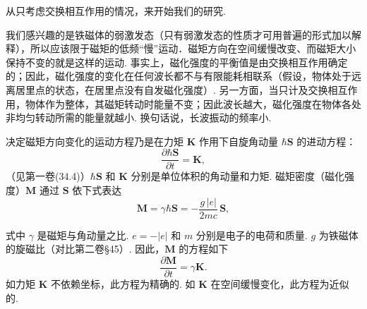 从只考虑交换相互作用的情况，来开始我们的研究.

我们感兴趣的是铁磁体的弱激发态（只有弱激发态的性质才可用普遍的形式加以解释），所以应该限于磁矩的低频“慢”运动．磁矩方向在空间缓慢改变、而磁矩大小保持不变的就是这样的运动. 事实上，磁化强度的平衡值是由交换相互作用确定的；因此，磁化强度的变化在任何波长都不与有限能耗相联系（假设，物体处于远离居里点的状态，在居里点没有自发磁化强度）. 另一方面，当只计及交换相互作用，物体作为整体，其磁矩转动时能量不变；因此波长越大，磁化强度在物体各处非均匀转动所需的能量就越小. 换句话说，长波振动的频率小.

决定磁矩方向变化的运动方程乃是在力矩 $\bm{K}$ 作用下自旋角动量 $\hbar\bm{S}$ 的进动方程：
\begin{equation*}
\frac{\partial\hbar\bm{S}}{\partial t}=\bm{K},
\end{equation*}
（见第一卷(34.4)）$\hbar\bm{S}$ 和 $\bm{K}$ 分别是单位体积的角动量和力矩. 磁矩密度（磁化强度）$\bm{M}$ 通过 $\bm{S}$ 依下式表达
\begin{equation*}
\bm{M}=\gamma\hbar\bm{S}=-\frac{g\,|e|}{2mc}\,\bm{S},
\end{equation*}

式中 $\gamma$ 是磁矩与角动量之比. $e=-|e|$ 和 $m$ 分别是电子的电荷和质量. $g$ 为铁磁体的旋磁比（对比第二卷§45）. 因此，$\bm{M}$ 的方程如下
\begin{equation}
\frac{\partial\bm{M}}{\partial t}=\gamma\bm{K}.
\end{equation}
如力矩 $\bm{K}$ 不依赖坐标，此方程为精确的. 如 $\bm{K}$ 在空间缓慢变化，此方程为近似的.


